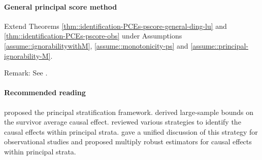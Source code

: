 \paragraph{General principal score method}
\label{hw::general-principal-score-jiangetal}

Extend Theorems \ref{thm::identification-PCEs-pscore-general-ding-lu} and \ref{thm::identification-PCEs-pscore-obs} under Assumptions  \ref{assume::ignorabilitywithM}, \ref{assume::monotonicity-ps} and \ref{assume::principal-ignorability-M}. 


Remark: See \citet{jiang2020multiply}. 


\paragraph{Recommended reading}

\citet{frangakis2002principal}  proposed the principal stratification framework. 
\citet{zhang2003estimation} derived large-sample bounds on the survivor average causal effect. 
\citet{jiang2020identification} reviewed various strategies to identify the causal effects within principal strata.
\citet{jiang2020multiply} gave a unified discussion of this strategy for observational studies and proposed multiply robust estimators for causal effects within principal strata.  
 
